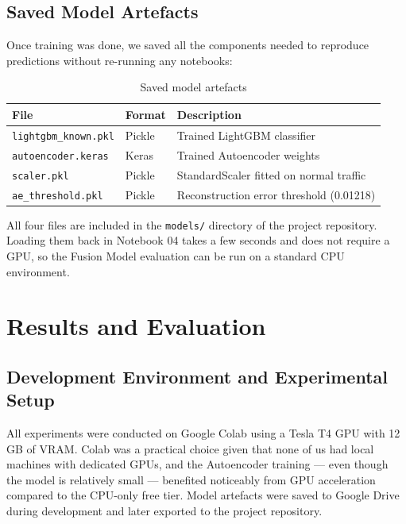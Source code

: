 \documentclass[12pt,a4paper]{report}
\begin{document}
\section{Saved Model Artefacts}

Once training was done, we saved all the components needed to reproduce predictions
without re-running any notebooks:

\begin{table}[H]
\centering
\caption{Saved model artefacts}
\label{tab:artefacts}
\begin{tabular}{lll}
\toprule
\textbf{File} & \textbf{Format} & \textbf{Description} \\
\midrule
\texttt{lightgbm\_known.pkl}  & Pickle  & Trained LightGBM classifier \\
\texttt{autoencoder.keras}    & Keras   & Trained Autoencoder weights \\
\texttt{scaler.pkl}           & Pickle  & StandardScaler fitted on normal traffic \\
\texttt{ae\_threshold.pkl}    & Pickle  & Reconstruction error threshold (0.01218) \\
\bottomrule
\end{tabular}
\end{table}

\noindent All four files are included in the \texttt{models/} directory of the
project repository. Loading them back in Notebook 04 takes a few seconds and
does not require a GPU, so the Fusion Model evaluation can be run on a standard
CPU environment.



\chapter{Results and Evaluation}

\section{Development Environment and Experimental Setup}

All experiments were conducted on Google Colab using a Tesla T4 GPU with
12\,GB of VRAM. Colab was a practical choice given that none of us had local
machines with dedicated GPUs, and the Autoencoder training — even though the
model is relatively small — benefited noticeably from GPU acceleration compared
to the CPU-only free tier. Model artefacts were saved to Google Drive during
development and later exported to the project repository.
\end{document}
